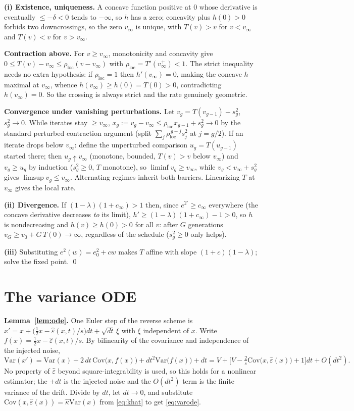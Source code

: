 \documentclass[11pt]{article}
\theoremstyle{remark}
\newcommand{\epshat}{\hat\varepsilon}
\newcommand{\Var}{\mathrm{Var}}
\newcommand{\Cov}{\mathrm{Cov}}
\begin{document}
\textbf{(i) Existence, uniqueness.} A concave function positive at $0$ whose derivative
is eventually $\le-\delta<0$ tends to $-\infty$, so $h$ has a zero; concavity plus
$h(0)>0$ forbids two downcrossings, so the zero $v_\infty$ is unique, with $T(v)>v$ for
$v<v_\infty$ and $T(v)<v$ for $v>v_\infty$.

\textbf{Contraction above.} For $v\ge v_\infty$, monotonicity and concavity give
$0\le T(v)-v_\infty\le\rho_{\mathrm{loc}}(v-v_\infty)$ with
$\rho_{\mathrm{loc}}=T'(v_\infty^+)<1$. The strict inequality needs no extra
hypothesis: if $\rho_{\mathrm{loc}}=1$ then $h'(v_\infty)=0$, making the concave $h$
maximal at $v_\infty$, whence $h(v_\infty)\ge h(0)=T(0)>0$, contradicting
$h(v_\infty)=0$. So the crossing is always strict and the rate genuinely geometric.

\textbf{Convergence under vanishing perturbations.} Let $v_g=T(v_{g-1})+s^2_g$,
$s^2_g\to0$. While iterates stay $\ge v_\infty$,
$x_g:=v_g-v_\infty\le\rho_{\mathrm{loc}}x_{g-1}+s^2_g\to0$ by the standard perturbed
contraction argument (split $\sum_j\rho_{\mathrm{loc}}^{\,g-j}s^2_j$ at $j=g/2$). If an iterate drops
below $v_\infty$: define the unperturbed comparison $u_g=T(u_{g-1})$ started there; then
$u_g\uparrow v_\infty$ (monotone, bounded, $T(v)>v$ below $v_\infty$) and $v_g\ge u_g$ by
induction ($s^2_g\ge0$, $T$ monotone), so $\liminf v_g\ge v_\infty$, while
$v_g<v_\infty+s^2_g$ gives $\limsup v_g\le v_\infty$. Alternating regimes inherit both
barriers. Linearizing $T$ at $v_\infty$ gives the local rate.

\textbf{(ii) Divergence.} If $(1-\lambda)(1+c_\infty)>1$ then, since $e^{2\prime}\ge
c_\infty$ everywhere (the concave derivative decreases \emph{to} its limit), $h'\ge
(1-\lambda)(1+c_\infty)-1>0$, so $h$ is nondecreasing and $h(v)\ge h(0)>0$ for all $v$:
after $G$ generations $v_G\ge v_0+G\,T(0)\to\infty$, regardless of the schedule
($s^2_g\ge0$ only helps).

\textbf{(iii)} Substituting $e^2(w)=e_0^2+cw$ makes $T$ affine with slope
$(1+c)(1-\lambda)$; solve the fixed point. \qed

\section{The variance ODE}\label{app:ode}

\textbf{Lemma~\ref{lem:ode}.} One Euler step of the reverse scheme is
$x'=x+\big(\tfrac12x-\epshat(x,t)/s\big)dt+\sqrt{dt}\,\xi$ with $\xi$ independent of $x$.
Write $f(x)=\tfrac12x-\epshat(x,t)/s$. By bilinearity of the covariance and independence of
the injected noise,
\[
\Var(x')=\Var(x)+2\,dt\,\Cov\big(x,f(x)\big)+dt^2\Var\big(f(x)\big)+dt
=V+\Big[V-\tfrac{2}{s}\Cov\big(x,\epshat(x)\big)+1\Big]dt+O(dt^2).
\]
No property of $\epshat$ beyond square-integrability is used, so this holds for a
nonlinear estimator; the $+dt$ is the injected noise and the $O(dt^2)$ term is the finite
variance of the drift. Divide by $dt$, let $dt\to0$, and substitute
$\Cov(x,\epshat(x))=\hat\kappa\Var(x)$ from \eqref{eq:khat} to get \eqref{eq:varode}.
\end{document}
